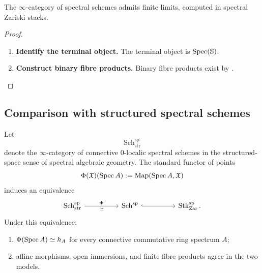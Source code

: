 \begin{corollary}
\label{cor:spectral-schemes-finite-limits}
The $\infty$-category of spectral schemes admits finite limits, computed
in spectral Zariski stacks.
\end{corollary}

\begin{proof}
\leavevmode
\begin{enumerate}[label=\textup{(\arabic*)}]
    \item \textbf{Identify the terminal object.}
    The terminal object is $\operatorname{Spec}(\mathbb S)$.

    \item \textbf{Construct binary fibre products.}
    Binary fibre products exist
    by .
\end{enumerate}
\end{proof}

\subsection{Comparison with structured spectral schemes}

\begin{theorem}
\label{thm:spectral-scheme-model-comparison}
Let
\[
    \operatorname{Sch}^{\mathrm{sp}}_{\mathrm{str}}
\]
denote the \(\infty\)-category of connective \(0\)-localic spectral schemes
in the structured-space sense of spectral algebraic geometry. The standard
functor of points
\[
    \Phi(\mathfrak X)(\operatorname{Spec} A)
    :=
    \operatorname{Map}(\operatorname{Spec} A,\mathfrak X)
\]
induces an equivalence
\[
\begin{tikzcd}[column sep=huge]
    \operatorname{Sch}^{\mathrm{sp}}_{\mathrm{str}}
        \arrow[r, "\Phi", "\simeq"']
    &
    \operatorname{Sch}^{\mathrm{sp}}
        \arrow[r, hook]
    &
    \operatorname{Stk}^{\mathrm{sp}}_{\mathrm{Zar}}.
\end{tikzcd}
\]
Under this equivalence:
\begin{enumerate}[label=(\roman*)]
    \item \(\Phi(\operatorname{Spec} A)\simeq h_A\) for every connective commutative ring
    spectrum \(A\);

    \item affine morphisms, open immersions, and finite fibre products agree
    in the two models.
\end{enumerate}
\end{theorem}

